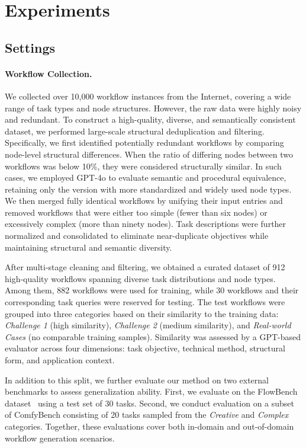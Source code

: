 \documentclass[runningheads]{llncs}
\begin{document}
\section{Experiments}

\subsection{Settings}

\paragraph{Workflow Collection.}
We collected over 10,000 workflow instances from the Internet, covering a wide range of task types and node structures.
%
However, the raw data were highly noisy and redundant.
%
To construct a high-quality, diverse, and semantically consistent dataset, we performed large-scale structural deduplication and filtering.
%
Specifically, we first identified potentially redundant workflows by comparing node-level structural differences.
%
When the ratio of differing nodes between two workflows was below 10\%, they were considered structurally similar.
%
In such cases, we employed GPT-4o to evaluate semantic and procedural equivalence, retaining only the version with more standardized and widely used node types.
%
We then merged fully identical workflows by unifying their input entries and removed workflows that were either too simple (fewer than six nodes) or excessively complex (more than ninety nodes).
%
Task descriptions were further normalized and consolidated to eliminate near-duplicate objectives while maintaining structural and semantic diversity.


After multi-stage cleaning and filtering, we obtained a curated dataset of 912 high-quality workflows spanning diverse task distributions and node types. 
Among them, 882 workflows were used for training, while 30 workflows and their corresponding task queries were reserved for testing. 
The test workflows were grouped into three categories based on their similarity to the training data: \textit{Challenge 1} (high similarity), \textit{Challenge 2} (medium similarity), and \textit{Real-world Cases} (no comparable training samples). 
Similarity was assessed by a GPT-based evaluator across four dimensions: task objective, technical method, structural form, and application context.

In addition to this split, we further evaluate our method on two external benchmarks to assess generalization ability. 
First, we evaluate on the FlowBench dataset~\cite{huang2025comfygpt} using a test set of 30 tasks. 
Second, we conduct evaluation on a subset of ComfyBench consisting of 20 tasks sampled from the \textit{Creative} and \textit{Complex} categories. 
Together, these evaluations cover both in-domain and out-of-domain workflow generation scenarios.
\end{document}
